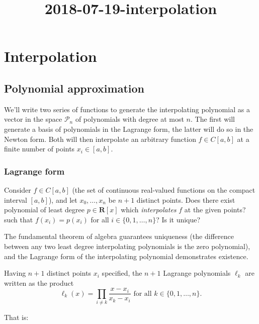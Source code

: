\documentclass{article}
\title{2018-07-19-interpolation}
\begin{document}
    
    
    
    
    

    
    \hypertarget{interpolation}{%
\section{Interpolation}\label{interpolation}}

\hypertarget{polynomial-approximation}{%
\subsection{Polynomial approximation}\label{polynomial-approximation}}

We'll write two series of functions to generate the interpolating
polynomial as a vector in the space \(\mathcal{P}_n\) of polynomials
with degree at most \(n\). The first will generate a basis of
polynomials in the Lagrange form, the latter will do so in the Newton
form. Both will then interpolate an arbitrary function \(f \in C[a,b]\)
at a finite number of points \(x_i \in [a,b]\).

\hypertarget{lagrange-form}{%
\subsubsection{Lagrange form}\label{lagrange-form}}

Consider \(f \in C[a,b]\) (the set of continuous real-valued functions
on the compact interval \([a,b]\)), and let \(x_0,\ldots,x_n\) be
\(n+1\) distinct points. Does there exist polynomial of least degree
\(p \in \mathbf{R}[x]\) which \emph{interpolates} \(f\) at the given
points? such that \(f(x_i) = p(x_i)\) for all
\(i \in \{0,1,\ldots,n\}\)? Is it unique?

The fundamental theorem of algebra guarantees uniqueness (the difference
between any two least degree interpolating polynomials is the zero
polynomial), and the Lagrange form of the interpolating polynomial
demonstrates existence.

Having \(n+1\) distinct points \(x_i\) specified, the \(n+1\) Lagrange
polynomials \(\ell_k\) are written as the product
\[\ell_k(x) = \prod_{i\neq k} \frac{x-x_i}{x_k-x_i} \text{ for all } k \in \{0,1,\ldots,n\}.\]

That is:
\end{document}
